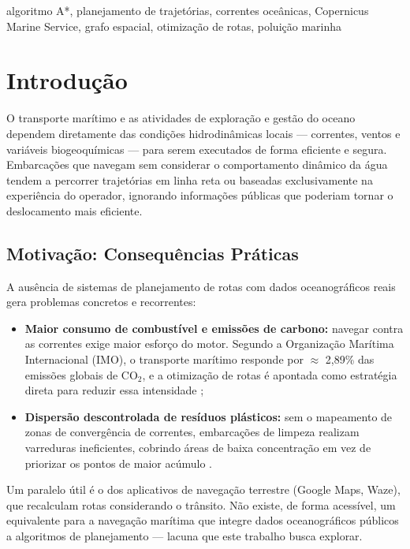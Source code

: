 \documentclass[conference]{IEEEtran}
\begin{document}
\begin{IEEEkeywords}
algoritmo A*, planejamento de trajetórias, correntes oceânicas, Copernicus Marine Service, grafo espacial, otimização de rotas, poluição marinha
\end{IEEEkeywords}

\section{Introdução}
O transporte marítimo e as atividades de exploração e gestão do oceano dependem diretamente das condições hidrodinâmicas locais --- correntes, ventos e variáveis biogeoquímicas --- para serem executados de forma eficiente e segura. Embarcações que navegam sem considerar o comportamento dinâmico da água tendem a percorrer trajetórias em linha reta ou baseadas exclusivamente na experiência do operador, ignorando informações públicas que poderiam tornar o deslocamento mais eficiente.

\subsection{Motivação: Consequências Práticas}
A ausência de sistemas de planejamento de rotas com dados oceanográficos reais gera problemas concretos e recorrentes:
\begin{itemize}
\item \textbf{Maior consumo de combustível e emissões de carbono:} navegar contra as correntes exige maior esforço do motor. Segundo a Organização Marítima Internacional (IMO), o transporte marítimo responde por $\approx$ 2,89\% das emissões globais de CO$_2$, e a otimização de rotas é apontada como estratégia direta para reduzir essa intensidade \cite{imo};
\item \textbf{Dispersão descontrolada de resíduos plásticos:} sem o mapeamento de zonas de convergência de correntes, embarcações de limpeza realizam varreduras ineficientes, cobrindo áreas de baixa concentração em vez de priorizar os pontos de maior acúmulo \cite{unep}.
\end{itemize}
Um paralelo útil é o dos aplicativos de navegação terrestre (Google Maps, Waze), que recalculam rotas considerando o trânsito. Não existe, de forma acessível, um equivalente para a navegação marítima que integre dados oceanográficos públicos a algoritmos de planejamento --- lacuna que este trabalho busca explorar.
\end{document}
